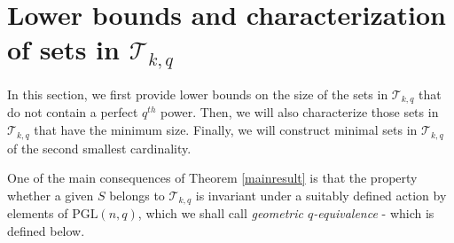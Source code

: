 \documentclass[12pt]{amsart}
\begin{document}

\section{Lower bounds and characterization of sets in $\mathcal{T}_{k,q}$}
In this section, we first provide lower bounds on the size of the sets in $\mathcal{T}_{k,q}$ that do not contain a perfect $q^{th}$ power. Then, we will also characterize those sets in $\mathcal{T}_{k,q}$ that have the minimum size. Finally, we will construct minimal sets in $\mathcal{T}_{k,q}$ of the second smallest cardinality. 

One of the main consequences of Theorem \ref{mainresult} is that the property whether a given $S$ belongs to $\mathcal{T}_{k,q}$ is invariant under a suitably defined action by elements of $\mathrm{PGL}(n,q)$, which we shall call \emph{geometric $q$-equivalence} - which is defined below.
\end{document}
